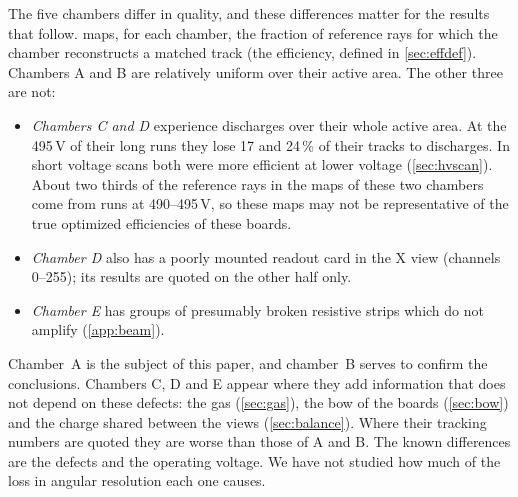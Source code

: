 The five chambers differ in quality, and these differences matter for the results that follow.  maps, for each
chamber, the fraction of reference rays for which the chamber reconstructs a matched track (the efficiency, defined in
\cref{sec:effdef}). Chambers A and B are relatively uniform over their active area. The other three are not:
\begin{itemize}
  \item \emph{Chambers C and D} experience discharges over their whole active area. At the 495\,V of their long runs they lose 17 and 24\,\% of their tracks to discharges. In short voltage scans both were more efficient at lower voltage (\cref{sec:hvscan}). About two thirds of the reference rays in the maps of these two chambers come from runs at 490--495\,V, so these maps may not be representative of the true optimized efficiencies of these boards.
  \item \emph{Chamber D} also has a poorly mounted readout card in the X view (channels 0--255); its results are quoted on the other half only.
  \item \emph{Chamber E} has groups of presumably broken resistive strips which do not amplify (\cref{app:beam}).
\end{itemize}
Chamber~A is the subject of this paper, and chamber~B serves to confirm the conclusions. Chambers C, D and E appear where they add
information that does not depend on these defects: the gas (\cref{sec:gas}), the bow of the boards (\cref{sec:bow}) and the charge shared between the views (\cref{sec:balance}). Where their tracking numbers are quoted they are worse
than those of A and B. The known differences are the defects and the operating voltage. We have not studied how much of the loss in
angular resolution each one causes.

